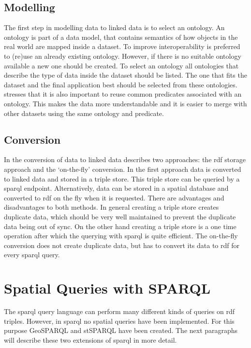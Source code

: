 \subsection{Modelling}
The first step in modelling data to linked data is to select an ontology. An ontology is part of a data model, that contains semantics of how objects in the real world are mapped inside a dataset. To improve interoperability is preferred to (re)use an already existing ontology. However, if there is no suitable ontology available a new one should be created. To select an ontology all ontologies that describe the type of data inside the dataset should be listed. The one that fits the dataset and the final application best should be selected from these ontologies. \cite{LD:Missier} stresses that it is also important to reuse common predicates associated with an ontology. This makes the data more understandable and it is easier to merge with other datasets using the same ontology and predicate. 

\subsection{Conversion}
In the conversion of data to linked data \cite{LD:Missier} describes two approaches: the \ac{rdf} storage approach and the `on-the-fly' conversion. In the first approach data is converted to linked data and stored in a triple store. This triple store can be queried by a \ac{sparql} endpoint. Alternatively, data can be stored in a spatial database and converted to \ac{rdf} on the fly when it is requested. There are advantages and disadvantages to both methods. In general creating a triple store creates duplicate data, which should be very well maintained to prevent the duplicate data being out of sync. On the other hand creating a triple store is a one time operation after which the querying with \ac{sparql} is quite efficient. The on-the-fly conversion does not create duplicate data, but has to convert its data to \ac{rdf} for every \ac{sparql} query.

\section{Spatial Queries with SPARQL}
\label{par:SpatialFilters}

The \ac{sparql} query language can perform many different kinds of queries on \ac{rdf} triples. However, in \ac{sparql} no spatial queries have been implemented. For this purpose GeoSPARQL and stSPARQL have been created. The next paragraphs will describe these two extensions of \ac{sparql} in more detail.

